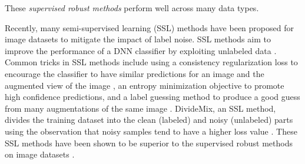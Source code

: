\documentclass[final]{cvpr}
\begin{document}
These \emph{supervised robust methods} perform well across many data types. 

Recently, many semi-supervised learning (SSL) methods have been proposed for image datasets to mitigate the impact of label noise. SSL methods aim to improve the performance of a DNN classifier by exploiting unlabeled data \cite{mixmatch}. Common tricks in SSL methods include using a consistency regularization loss to encourage the classifier to have similar predictions for an image  and the augmented view of the image , an entropy minimization objective to promote high confidence predictions, and a label guessing method to produce a good guess from many augmentations of the same image \cite{mixmatch,mixup}. 
DivideMix, an SSL method, divides the training dataset into the clean (labeled) and noisy (unlabeled) parts using the observation that noisy samples tend to have a higher loss value \cite{dividemix}. These SSL methods have been shown to be superior to the supervised robust methods on image datasets \cite{elr,dividemix}.


\vspace{-0.1cm}
\end{document}
